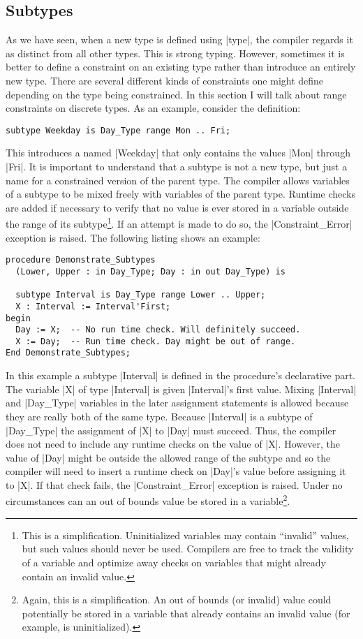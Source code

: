 \subsection{Subtypes}

As we have seen, when a new type is defined using |type|, the compiler regards it as distinct
from all other types. This is strong typing. However, sometimes it is better to define a
constraint on an existing type rather than introduce an entirely new type. There are several
different kinds of constraints one might define depending on the type being constrained. In this
section I will talk about range constraints on discrete types. As an example, consider the
definition:

\begin{lstlisting}
subtype Weekday is Day_Type range Mon .. Fri;
\end{lstlisting}

\noindent This introduces a  named |Weekday| that only contains the values
|Mon| through |Fri|. It is important to understand that a subtype is not a new type, but just a
name for a constrained version of the parent type. The compiler allows variables of a subtype to
be mixed freely with variables of the parent type. Runtime checks are added if necessary to
verify that no value is ever stored in a variable outside the range of its subtype\footnote{This
  is a simplification. Uninitialized variables may contain ``invalid'' values, but such values
  should never be used. Compilers are free to track the validity of a variable and optimize away
  checks on variables that might already contain an invalid value.}. If an attempt is made to do
so, the |Constraint_Error| exception is raised. The following listing shows an example:

\begin{lstlisting}
procedure Demonstrate_Subtypes
  (Lower, Upper : in Day_Type; Day : in out Day_Type) is

  subtype Interval is Day_Type range Lower .. Upper;
  X : Interval := Interval'First;
begin
  Day := X;  -- No run time check. Will definitely succeed.
  X := Day;  -- Run time check. Day might be out of range.
End Demonstrate_Subtypes;
\end{lstlisting}

In this example a subtype |Interval| is defined in the procedure's declarative part. The
variable |X| of type |Interval| is given |Interval|'s first value. Mixing |Interval| and
|Day_Type| variables in the later assignment statements is allowed because they are really both
of the same type. Because |Interval| is a subtype of |Day_Type| the assignment of |X| to |Day|
must succeed. Thus, the compiler does not need to include any runtime checks on the value of |X|.
However, the value of |Day| might be outside the allowed range of the subtype and so the
compiler will need to insert a runtime check on |Day|'s value before assigning it to |X|. If
that check fails, the |Constraint_Error| exception is raised. Under no circumstances can an out
of bounds value be stored in a variable\footnote{Again, this is a simplification. An out of
  bounds (or invalid) value could potentially be stored in a variable that already contains an
  invalid value (for example, is uninitialized).}.

